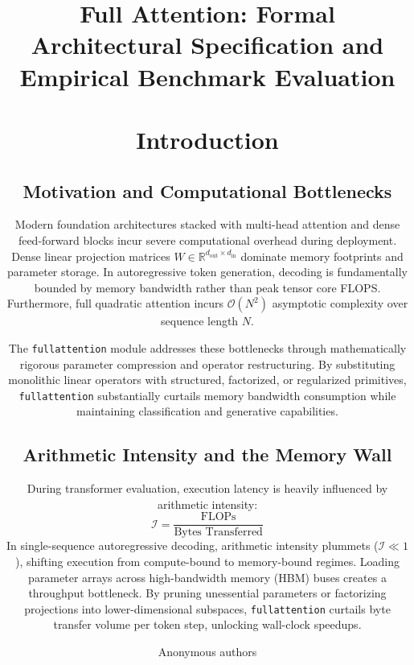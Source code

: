 \title{\textbf{Full Attention: Formal Architectural Specification and Empirical Benchmark Evaluation}

\author{Anonymous authors}


\section{Introduction}

\subsection{Motivation and Computational Bottlenecks}
Modern foundation architectures stacked with multi-head attention and dense feed-forward blocks incur severe computational overhead during deployment. Dense linear projection matrices $W \in \mathbb{R}^{d_{\text{out}} \times d_{\text{in}}}$ dominate memory footprints and parameter storage. In autoregressive token generation, decoding is fundamentally bounded by memory bandwidth rather than peak tensor core FLOPS. Furthermore, full quadratic attention incurs $\mathcal{O}(N^2)$ asymptotic complexity over sequence length $N$.

The \texttt{fullattention} module addresses these bottlenecks through mathematically rigorous parameter compression and operator restructuring. By substituting monolithic linear operators with structured, factorized, or regularized primitives, \texttt{fullattention} substantially curtails memory bandwidth consumption while maintaining classification and generative capabilities.

\subsection{Arithmetic Intensity and the Memory Wall}
During transformer evaluation, execution latency is heavily influenced by arithmetic intensity:
\[
\mathcal{I} = \frac{\text{FLOPs}}{\text{Bytes Transferred}}
\]
In single-sequence autoregressive decoding, arithmetic intensity plummets ($\mathcal{I} \ll 1$), shifting execution from compute-bound to memory-bound regimes. Loading parameter arrays across high-bandwidth memory (HBM) buses creates a throughput bottleneck. By pruning unessential parameters or factorizing projections into lower-dimensional subspaces, \texttt{fullattention} curtails byte transfer volume per token step, unlocking wall-clock speedups.

}
